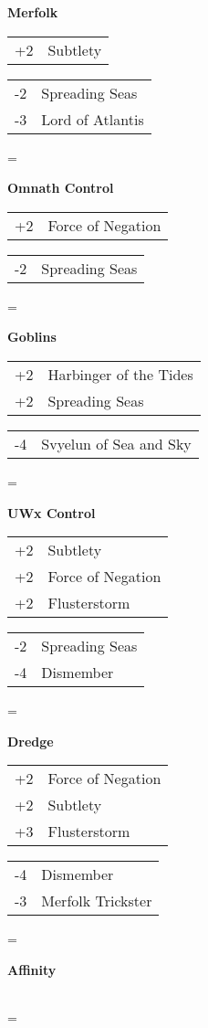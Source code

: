 \documentclass[fontsize=12pt,paper=a4]{scrartcl}
\newenvironment{absolutelynopagebreak}
  {\par\nobreak\vfil\penalty0\vfilneg
   \vtop\bgroup}
  {\par\xdef\tpd{\the\prevdepth}\egroup
   \prevdepth=\tpd}
\newenvironment{decklist}{%
    \begin{tabular}{>{\hspace{-4pt}}r<{\hspace{-3pt}}>{\hspace{-3pt}}l<{\hspace{-4pt}}}
    }{%
    \end{tabular}
    \par
}
\newcommand{\card}[2]{#1 & #2\\}
\newenvironment{sideboardguide}{%
    \newpage
    \begin{multicols}{4}
        \begin{small}
        }{%
        \end{small}
    \end{multicols}
}
\newenvironment{matchup}[1]{%
    \begin{absolutelynopagebreak}
        \textbf{#1}\par
    }{%
    \end{absolutelynopagebreak}
    \par\vspace{2em}
}
\begin{document}
\begin{sideboardguide}
\begin{matchup}{Merfolk}
\begin{decklist}
            \card{+2}{Subtlety}
        \end{decklist}
        \begin{decklist}
            \card{-2}{Spreading Seas}
            \card{-3}{Lord of Atlantis}
        \end{decklist}
    \end{matchup}
    \begin{matchup}{Omnath Control}
        \begin{decklist}
            \card{+2}{Force of Negation}
        \end{decklist}
        \begin{decklist}
            \card{-2}{Spreading Seas}
        \end{decklist}
    \end{matchup}
    \begin{matchup}{Goblins}
        \begin{decklist}
            \card{+2}{Harbinger of the Tides}
            \card{+2}{Spreading Seas}
        \end{decklist}
        \begin{decklist}
            \card{-4}{Svyelun of Sea and Sky}
        \end{decklist}
    \end{matchup}
    \begin{matchup}{UWx Control}
        \begin{decklist}
            \card{+2}{Subtlety}
            \card{+2}{Force of Negation}
            \card{+2}{Flusterstorm}
        \end{decklist}
        \begin{decklist}
            \card{-2}{Spreading Seas}
            \card{-4}{Dismember}
        \end{decklist}
    \end{matchup}
    \begin{matchup}{Dredge}
        \begin{decklist}
            \card{+2}{Force of Negation}
            \card{+2}{Subtlety}
            \card{+3}{Flusterstorm}
        \end{decklist}
        \begin{decklist}
            \card{-4}{Dismember}
            \card{-3}{Merfolk Trickster}
        \end{decklist}
    \end{matchup}
    \begin{matchup}{Affinity}
        \begin{decklist}

\end{decklist}
\end{matchup}
\end{sideboardguide}
\end{document}

